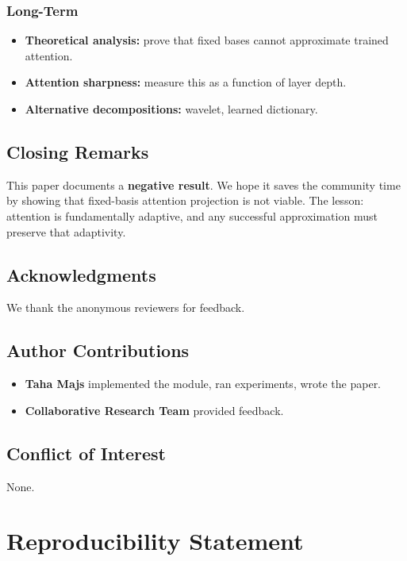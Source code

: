 \subsubsection{Long-Term}

\begin{itemize}
\item \textbf{Theoretical analysis:} prove that fixed bases cannot approximate
  trained attention.
\item \textbf{Attention sharpness:} measure this as a function of layer depth.
\item \textbf{Alternative decompositions:} wavelet, learned dictionary.

\end{itemize}
\subsection{Closing Remarks}

This paper documents a \textbf{negative result}. We hope it saves the community 
time by showing that fixed-basis attention projection is not viable. The 
lesson: attention is fundamentally adaptive, and any successful 
approximation must preserve that adaptivity.

\subsection{Acknowledgments}

We thank the anonymous reviewers for feedback.

\subsection{Author Contributions}

\begin{itemize}
\item \textbf{Taha Majs} implemented the module, ran experiments, wrote the paper.
\item \textbf{Collaborative Research Team} provided feedback.

\end{itemize}
\subsection{Conflict of Interest}

None.




\section{Reproducibility Statement}

